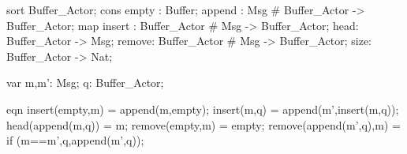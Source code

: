sort Buffer_Actor;
cons empty : Buffer;
     append : Msg # Buffer_Actor -> Buffer_Actor;
map
    insert : Buffer_Actor # Msg -> Buffer_Actor;
    head: Buffer_Actor -> Msg;
    remove: Buffer_Actor # Msg -> Buffer_Actor;
    size: Buffer_Actor -> Nat;

var 
 m,m': Msg;
 q: Buffer_Actor;
 
eqn
   insert(empty,m) = append(m,empty);
   insert(m,q) = append(m',insert(m,q));
   head(append(m,q)) = m;
   remove(empty,m) = empty;
   remove(append(m',q),m) = if (m==m',q,append(m',q));
